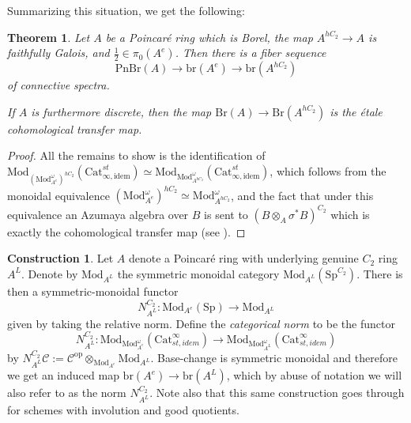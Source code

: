 \documentclass{article}
\newcommand{\op}{\mathrm{op}} %
\newcommand{\pnbr}{\ensuremath{\mathrm{PnBr}}}
\newtheorem{theorem}[equation]{Theorem}
\theoremstyle{definition}
\newtheorem{construction}[equation]{Construction}
\newcommand{\Lucy}[1]{\todo[color=cyan!30]{\linespread{1}\footnotesize L: #1}}
\begin{document}
    Summarizing this situation, we get the following:
    \begin{theorem}
        Let $A$ be a Poincar{\'e} ring which is Borel, the map $A^{hC_2}\to A$ is faithfully Galois, and $\frac{1}{2}\in \pi_0(A^e)$. 
        Then there is a fiber sequence \[\pnbr(A)\to \mathrm{br}(A^e)\to \mathrm{br}(A^{hC_2}) \] of connective spectra. 

        If $A$ is furthermore discrete, then the map $\mathrm{Br}(A)\to \mathrm{Br}(A^{hC_2})$ is the {\'e}tale cohomological transfer map. 
    \end{theorem}
    \begin{proof}
        All the remains to show is the identification of $\mathrm{Mod}_{(\mathrm{Mod}_{A^e}^\omega)^{hC_2}}(\mathrm{Cat}^{st}_{\infty,\textrm{idem}})\simeq \mathrm{Mod}_{\mathrm{Mod}_{A^{hC_2}}^\omega}(\mathrm{Cat}^{st}_{\infty,\textrm{idem}})$, which follows from the monoidal equivalence $(\mathrm{Mod}_{A^e}^{\omega})^{hC_2}\simeq \mathrm{Mod}_{A^{hC_2}}^\omega$, and the fact that under this equivalence an Azumaya algebra over $B$ is sent to $(B\otimes_A\sigma^*B)^{C_2}$ which is exactly the cohomological transfer map (see \cite[Example 6.2.3]{azumaya_involution}). \Lucy{Definition 6.2?}
    \end{proof}

    \begin{construction}
        Let $A$ denote a Poincar{\'e} ring with underlying genuine $C_2$ ring $A^L$. Denote by $\mathrm{Mod}_{A^L}$ the symmetric monoidal category $\mathrm{Mod}_{A^L}(\mathrm{Sp}^{C_2})$. There is then a symmetric-monoidal functor \[N^{C_2}_{A^L}:\mathrm{Mod}_{A^e}(\mathrm{Sp})\to \mathrm{Mod}_{A^L}\] given by taking the relative norm. Define the \textit{categorical norm} to be the functor \[N^{C_2}_{A^L}:\mathrm{Mod}_{\mathrm{Mod}_{A^e}^\omega}(\mathrm{Cat}_{st,idem}^\infty)\to \mathrm{Mod}_{\mathrm{Mod}_{A^L}^\omega}(\mathrm{Cat}_{st,idem}^\infty)\] by $N^{C_2}_{A^L}\mathcal{C}:=\mathcal{C}^{\op}\otimes_{\mathrm{Mod}_{A^e}}\mathrm{Mod}_{A^L}$. Base-change is symmetric monoidal and therefore we get an induced map $\mathrm{br}(A^e)\to \mathrm{br}(A^L)$, which by abuse of notation we will also refer to as the norm $N^{C_2}_{A^L}$. Note also that this same construction goes through for schemes with involution and good quotients.
    \end{construction}
\end{document}
